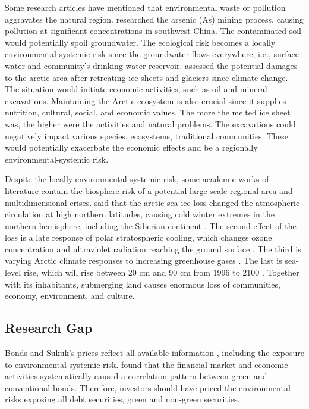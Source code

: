 \documentclass[sn-basic]{sn-jnl}%
\theoremstyle{thmstyleone}%
\theoremstyle{thmstyletwo}%
\theoremstyle{thmstylethree}%
\begin{document}
Some research articles have mentioned that environmental waste or pollution aggravates the natural region. \citet{liu2020soil} researched the arsenic (As) mining process, causing pollution at significant concentrations in southwest China. The contaminated soil would potentially spoil groundwater. The ecological risk becomes a locally environmental-systemic risk since the groundwater flows everywhere, i.e., surface water and community’s drinking water reservoir. \citet{johannsdottir2019systemic} assessed the potential damages to the arctic area after retreating ice sheets and glaciers since climate change. The situation would initiate economic activities, such as oil and mineral excavations. Maintaining the Arctic ecosystem is also crucial since it supplies nutrition, cultural, social, and economic values. The more the melted ice sheet was, the higher were the activities and natural problems. The excavations could negatively impact various species, ecosystems, traditional communities. These would potentially exacerbate the economic effects and be a regionally environmental-systemic risk.

Despite the locally environmental-systemic risk, some academic works of literature contain the biosphere risk of a potential large-scale regional area and multidimensional crises. \citep{tang2013cold} said that the arctic sea-ice loss changed the atmospheric circulation at high northern latitudes, causing cold winter extremes in the northern hemisphere, including the Siberian continent \citep{ogawa2018evaluating}. The second effect of the loss is a late response of polar stratospheric cooling, which changes ozone concentration and ultraviolet radiation reaching the ground surface \citep{screen2013atmospheric}. The third is varying Arctic climate responses to increasing greenhouse gases \citep{screen2013atmospheric}. The last is sea-level rise, which will rise between 20 cm and 90 cm from 1996 to 2100 \citep{yohe1998sea}. Together with its inhabitants, submerging land causes enormous loss of communities, economy, environment, and culture.

\subsection{Research Gap}
Bonds and Sukuk’s prices reflect all available information \citep{malkiel1970efficient}, including the exposure to environmental-systemic risk. \citet{broadstock2019time} found that the financial market and economic activities systematically caused a correlation pattern between green and conventional bonds. Therefore, investors should have priced the environmental risks exposing all debt securities, green and non-green securities.
\end{document}
